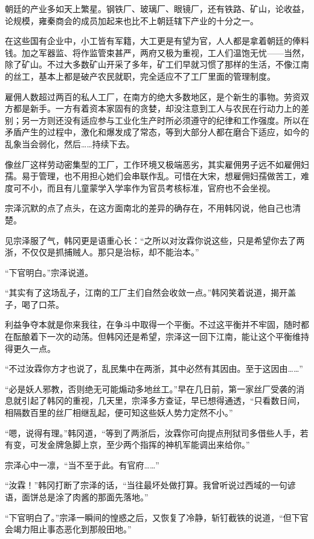 朝廷的产业多如天上繁星。钢铁厂、玻璃厂、眼镜厂，还有铁路、矿山，论收益，论规模，雍秦商会的成员加起来也比不上朝廷辖下产业的十分之一。

在这些国有企业中，小工皆有军籍，大工更是有望为官，人人都是拿着朝廷的俸料钱。加之军器监、将作监管束甚严，两府又极为重视，工人们温饱无忧——当然，除了矿山。不过大多数矿山开采了多年，矿工们早就习惯了那样的生活，不像江南的丝工，基本上都是破产农民就职，完全适应不了工厂里面的管理制度。

雇佣人数超过两百的私人工厂，在南方的绝大多数地区，是个新生的事物。劳资双方都是新手。一方有着资本家固有的贪婪，却没注意到工人与农民在行动力上的差别；另一方则还没有适应参与工业化生产时所必须遵守的纪律和工作强度。所以在矛盾产生的过程中，激化和爆发成了常态，等到大部分人都在磨合下适应，如今的乱象当会弱化，然后……持续下去。

像丝厂这样劳动密集型的工厂，工作环境又极端恶劣，其实雇佣男子远不如雇佣妇孺。易于管理，也不用担心她们会串联作乱。可惜在大宋，想雇佣妇孺做苦工，难度可不小，而且有儿童蒙学入学率作为官员考核标准，官府也不会坐视。

宗泽沉默的点了点头，在这方面南北的差异的确存在，不用韩冈说，他自己也清楚。

见宗泽服了气，韩冈更是语重心长：“之所以对汝霖你说这些，只是希望你去了两浙，不仅仅是抓捕贼人。那只是治标，却不能治本。”

“下官明白。”宗泽说道。

“其实有了这场乱子，江南的工厂主们自然会收敛一点。”韩冈笑着说道，揭开盖子，喝了口茶。

利益争夺本就是你来我往，在争斗中取得一个平衡。不过这平衡并不牢固，随时都在酝酿着下一次的动荡。但韩冈还是希望，宗泽这一回下江南，能让这个平衡维持得更久一点。

“不过汝霖你方才也说了，乱民集中在两浙，其中必然有其因由。至于这因由……”

“必是妖人邪教，否则绝无可能煽动多地丝工。”早在几日前，第一家丝厂受袭的消息就引起了韩冈的重视，几天里，宗泽多方查证，早已想得通透，“只看数日间，相隔数百里的丝厂相继乱起，便可知这些妖人势力定然不小。”

“嗯，说得有理。”韩冈道，“等到了两浙后，汝霖你可向提点刑狱司多借些人手，若有变，可发金牌急脚上京，至少两个指挥的神机军能调出来给你。”

宗泽心中一凛，“当不至于此。有官府……”

“汝霖！”韩冈打断了宗泽的话，“当往最坏处做打算。我曾听说过西域的一句谚语，面饼总是涂了肉酱的那面先落地。”

“下官明白了。”宗泽一瞬间的惶惑之后，又恢复了冷静，斩钉截铁的说道，“但下官会竭力阻止事态恶化到那般田地。”

